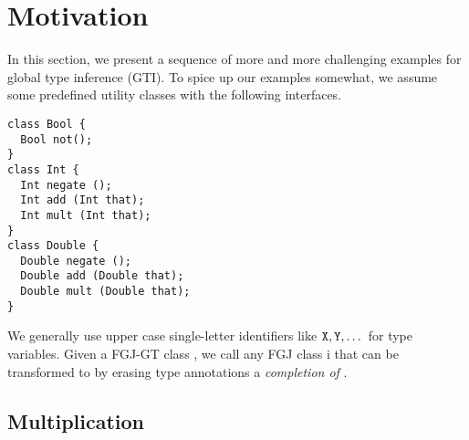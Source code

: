 \section{Motivation}
\label{sec:motivation}


In this section, we present a sequence of more and more challenging
examples for global type inference (GTI). To spice up our examples
somewhat, we assume some predefined utility classes with the following
interfaces.
\begin{lstlisting}
class Bool {
  Bool not(); 
}
class Int {
  Int negate ();
  Int add (Int that);
  Int mult (Int that);
}
class Double {
  Double negate ();
  Double add (Double that);
  Double mult (Double that);
}
\end{lstlisting}

We generally use upper case single-letter identifiers like ${\tt X},
{\tt Y}, \dots$ for type variables.
Given a FGJ-GT class , 
we call any FGJ class \CL i that can be transformed to  by
erasing type annotations a \emph{completion of  }.

\subsection{Multiplication}
\label{sec:multiplication}

